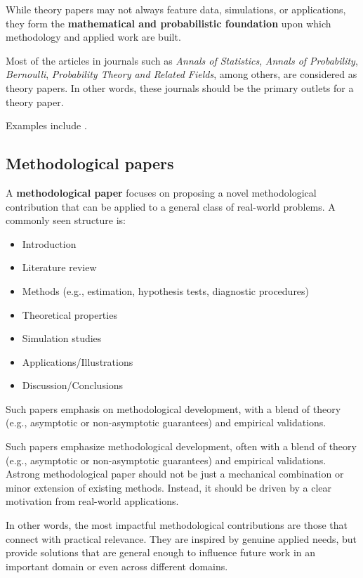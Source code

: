 \documentclass[
]{book}
\providecommand{\tightlist}{%
  \setlength{\itemsep}{0pt}\setlength{\parskip}{0pt}}
\theoremstyle{definition}
\theoremstyle{definition}
\theoremstyle{definition}
\theoremstyle{definition}
\theoremstyle{remark}
\begin{document}
While theory papers may not always feature data, simulations, or applications, they form the \textbf{mathematical and probabilistic foundation} upon which methodology and applied work are built.

Most of the articles in journals such as \emph{Annals of Statistics}, \emph{Annals of Probability}, \emph{Bernoulli}, \emph{Probability Theory and Related Fields}, among others, are considered as theory papers. In other words, these journals should be the primary outlets for a theory paper.

Examples include \citet{Foygel2021}.

\subsection{Methodological papers}\label{methodological-papers}

A \textbf{methodological paper} focuses on proposing a novel methodological contribution that can be applied to a general class of real-world problems. A commonly seen structure is:

\begin{itemize}
\tightlist
\item
  Introduction
\item
  Literature review
\item
  Methods (e.g., estimation, hypothesis tests, diagnostic procedures)\\
\item
  Theoretical properties\\
\item
  Simulation studies\\
\item
  Applications/Illustrations\\
\item
  Discussion/Conclusions
\end{itemize}

Such papers emphasis on methodological development, with a blend of theory (e.g., asymptotic or non-asymptotic guarantees) and empirical validations.

Such papers emphasize methodological development, often with a blend of theory (e.g., asymptotic or non-asymptotic guarantees) and empirical validations. Astrong methodological paper should not be just a mechanical combination or minor extension of existing methods. Instead, it should be driven by a clear motivation from real-world applications.

In other words, the most impactful methodological contributions are those that connect with practical relevance. They are inspired by genuine applied needs, but provide solutions that are general enough to influence future work in an important domain or even across different domains.
\end{document}
